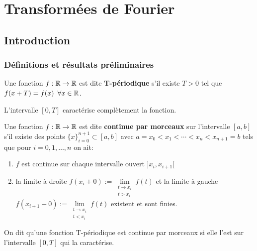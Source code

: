 \chapter{Transformées de Fourier}


\section{Introduction}


\subsection{Définitions et résultats préliminaires}

\begin{definition}
    Une fonction $f: \mathbb{R} \rightarrow \mathbb{R}$ est dite \textbf{T-périodique} s'il existe $T > 0$ tel que $f(x + T) = f(x) \enspace \forall x \in \mathbb{R}$.
    
    L'intervalle $[0, T]$ caractérise complètement la fonction.
\end{definition}


\begin{definition}[14.1.i, p.103]

    Une fonction $f: \mathbb{R} \rightarrow \mathbb{R}$ est dite \textbf{continue par morceaux} sur l'intervalle $[a, b]$ s'il existe des points $ \{x\}_{i = 0}^{n + 1} \subset [a, b]$ avec $a = x_0 < x_1 < \cdots < x_n < x_{n + 1} = b$ tels que pour $i = 0, 1, \ldots, n$ on ait:
    
    \begin{enumerate}

        \item
        $f$ est continue sur chaque intervalle ouvert $]x_i, x_{i + 1}[$

        \item
        la limite à droite $f(x_i + 0) := \lim\limits_{\substack{t \rightarrow x_i \\ t > x_i}} f(t)$ et la limite à gauche $f(x_{i + 1} - 0) := \lim\limits_{\substack{t \rightarrow x_i \\ t < x_i}} f(t)$ existent et sont finies.

    \end{enumerate}

\end{definition}


\begin{terminology}
    On dit qu'une fonction T-périodique est continue par morceaux si elle l'est sur l'intervalle $[0, T]$ qui la caractérise.
\end{terminology}


